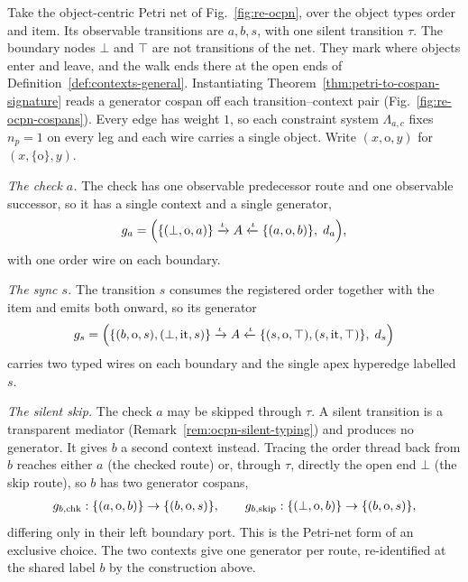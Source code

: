 \begin{exmp}
  \label{ex:running-pn-cospan}
  Take the object-centric Petri net of Fig.~\ref{fig:re-ocpn}, over the object
  types $\mathrm{order}$ and $\mathrm{item}$. Its observable transitions are
  $a,b,s$, with one silent transition $\tau$. The boundary nodes $\bot$ and $\top$ are not
  transitions of the net. They mark where objects enter and leave, and the walk ends there at the
  open ends of Definition~\ref{def:contexts-general}. Instantiating
  Theorem~\ref{thm:petri-to-cospan-signature} reads a generator cospan off
  each transition--context pair (Fig.~\ref{fig:re-ocpn-cospans}). Every edge has weight $1$,
  so each constraint system $\Lambda_{a,c}$ fixes $n_p=1$ on every leg and each wire carries a
  single object. Write $(x,\mathrm{o},y)$ for $(x,\{\mathrm{o}\},y)$.

  \emph{The check $a$.} The check has one observable predecessor route and one
  observable successor, so it has a single context and a single generator,
  \[
    g_a = \Bigl(\{(\bot,\mathrm{o},a)\}
      \xrightarrow{\iota} A \xleftarrow{\iota}
      \{(a,\mathrm{o},b)\},\; d_a\Bigr),
  \]
  with one order wire on each boundary.

  \emph{The sync $s$.} The transition $s$ consumes the registered order together
  with the item and emits both onward, so its generator
  \begin{gather*}
    g_s = \Bigl(\{(b,\mathrm{o},s),(\bot,\mathrm{it},s)\}
      \xrightarrow{\iota} A \xleftarrow{\iota} 
      \{(s,\mathrm{o},\top),(s,\mathrm{it},\top)\},\; d_s\Bigr)
  \end{gather*}
  carries two typed wires on each boundary and the single apex hyperedge labelled
  $s$.

  \emph{The silent skip.} The check $a$ may be skipped through $\tau$. A silent
  transition is a transparent mediator (Remark~\ref{rem:ocpn-silent-typing}) and
  produces no generator. It gives $b$ a second context instead. Tracing the order
  thread back from $b$ reaches either $a$ (the checked route) or, through $\tau$,
  directly the open end $\bot$ (the skip route), so $b$ has two generator cospans,
  \begin{gather*}
    g_{b,\mathrm{chk}} : \{(a,\mathrm{o},b)\}\to\{(b,\mathrm{o},s)\},\qquad
    g_{b,\mathrm{skip}} : \{(\bot,\mathrm{o},b)\}\to\{(b,\mathrm{o},s)\},
  \end{gather*}
  differing only in their left boundary port. This is the Petri-net form of an
  exclusive choice. The two contexts give one generator per route, re-identified at the shared
  label $b$ by the construction above.
\end{exmp}


